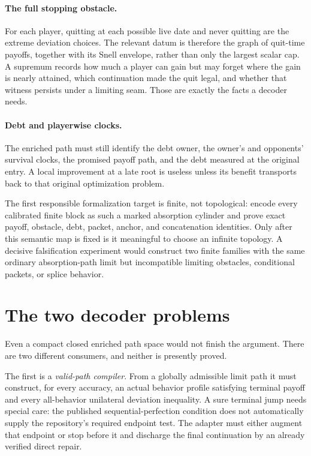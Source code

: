 \documentclass[11pt]{article}
\begin{document}
\paragraph{The full stopping obstacle.}
For each player, quitting at each possible live date and never quitting are
the extreme deviation choices.  The relevant datum is therefore the graph of
quit-time payoffs, together with its Snell envelope, rather than only the
largest scalar cap.  A supremum records how much a player can gain but may
forget where the gain is nearly attained, which continuation made the quit
legal, and whether that witness persists under a limiting seam.  Those are
exactly the facts a decoder needs.

\paragraph{Debt and playerwise clocks.}
The enriched path must still identify the debt owner, the owner's and
opponents' survival clocks, the promised payoff path, and the debt measured at
the original entry.  A local improvement at a late root is useless unless its
benefit transports back to that original optimization problem.

The first responsible formalization target is finite, not topological: encode
every calibrated finite block as such a marked absorption cylinder and prove
exact payoff, obstacle, debt, packet, anchor, and concatenation identities.
Only after this semantic map is fixed is it meaningful to choose an infinite
topology.  A decisive falsification experiment would construct two finite
families with the same ordinary absorption-path limit but incompatible
limiting obstacles, conditional packets, or splice behavior.

\section{The two decoder problems}

Even a compact closed enriched path space would not finish the argument.
There are two different consumers, and neither is presently proved.

The first is a \emph{valid-path compiler}.  From a globally admissible limit
path it must construct, for every accuracy, an actual behavior profile
satisfying terminal payoff and every all-behavior unilateral
deviation inequality.  A sure terminal jump needs special care: the published
sequential-perfection condition does not automatically supply the repository's
required endpoint test.  The adapter must either augment that endpoint or stop
before it and discharge the final continuation by an already verified direct
repair.
\end{document}

